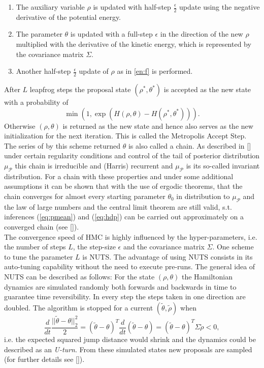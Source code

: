 \documentclass[12pt,letterpaper]{article}
\begin{document}
\begin{enumerate}
\item The auxiliary variable $\rho$ is updated with half-step $\frac{\epsilon}{2}$ update using the negative derivative of the potential energy.
\label{en:f}
\item The parameter $\theta$ is updated with a full-step $\epsilon$ in the direction of the new $\rho$ multiplied with the derivative of the kinetic energy, which is represented by the covariance matrix $\Sigma$.
\item Another half-step $\frac{\epsilon}{2}$ update of $\rho$ as in \ref{en:f} is performed.
\end{enumerate}  
After $L$ leapfrog steps the proposal state $(\rho^*,\theta^*)$ is accepted as the new state with a probability of 
\[\min(1, \exp(H(\rho, \theta)-H(\rho^*,\theta^*))).
\] Otherwise $(\rho, \theta)$ is returned as the new state and hence also serves as the new initialization for the next iteration. This is called the Metropolis Accept Step.\\
 The series of by this scheme returned $\theta$ is also called a chain. As described in [\cite{convhmc}] under certain regularity conditions and control of the tail of posterior distribution $\mu_\mathcal{P}$ this chain is irreducible and (Harris) recurrent and $\mu_\mathcal{P}$ is its so-called invariant distribution. For a chain with these properties and under some additional assumptions it can be shown that with the use of ergodic theorems, that the chain  converges for almost every starting parameter $\theta_0$ in distribution to $\mu_\mathcal{P}$ and the law of large numbers and the central limit theorem are still valid, s.t. 
inferences (\ref{eq:pmean}) and (\ref{eq:hdp}) can be carried out approximately on a converged chain (see [\cite{mcstability}]). \\
The convergence speed of HMC is highly influenced by the hyper-parameters, i.e. the number of steps $L$, the step-size $\epsilon$ and the covariance matrix $\Sigma$.
One scheme to tune the parameter $L$ is NUTS. The advantage of using NUTS consists in its auto-tuning capability without the need to execute pre-runs. The general idea of NUTS can be described as follows: For the state $(\rho,\theta)$ the Hamiltonian dynamics are simulated randomly both forwards and backwards in time to guarantee time reversibility. In every step the steps taken in one direction are doubled. The algorithm is stopped for a current $(\tilde{\theta},\tilde{\rho})$ when 
\begin{equation*}
\frac{d}{dt}\frac{||\tilde{\theta} - \theta||^2_2}{2} = (\tilde{\theta} -\theta )^T\frac{d}{dt}(\tilde{\theta} - \theta) = (\tilde{\theta} -\theta )^T\Sigma\tilde{\rho} < 0,
\end{equation*} i.e. the expected squared jump distance would shrink and the dynamics could be described as an \textit{U-turn}. From these simulated states new proposals are sampled (for further details see [\cite{nuts}]). 
\label{sec:HMC}
\end{document}
